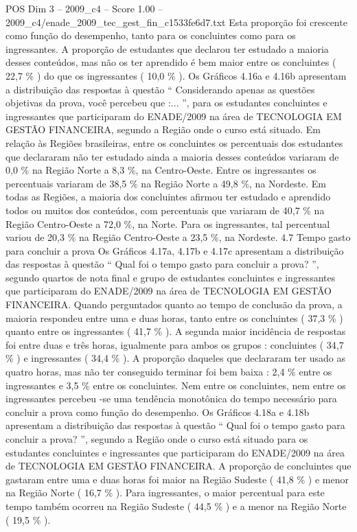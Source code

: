 \begin{textsample}{POS Dim 3 – 2009\_c4 – Score 1.00 – 2009\_c4/enade\_2009\_tec\_gest\_fin\_c1533fe6d7.txt}
Esta proporção foi crescente como função do desempenho, tanto para os concluintes como para os ingressantes.
A proporção de estudantes que declarou ter estudado a maioria desses conteúdos, mas não os ter aprendido é bem maior entre os concluintes ( 22,7 \% ) do que os ingressantes ( 10,0 \% ).
Os Gráficos 4.16a e 4.16b apresentam a distribuição das respostas à questão “ Considerando apenas as questões objetivas da prova, você percebeu que :... ”, para os estudantes concluintes e ingressantes que participaram do ENADE/2009 na área de TECNOLOGIA EM GESTÃO FINANCEIRA, segundo a Região onde o curso está situado.
Em relação às Regiões brasileiras, entre os concluintes os percentuais dos estudantes que declararam não ter estudado ainda a maioria desses conteúdos variaram de 0,0 \% na Região Norte a 8,3 \%, na Centro-Oeste.
Entre os ingressantes os percentuais variaram de 38,5 \% na Região Norte a 49,8 \%, na Nordeste.
Em todas as Regiões, a maioria dos concluintes afirmou ter estudado e aprendido todos ou muitos dos conteúdos, com percentuais que variaram de 40,7 \% na Região Centro-Oeste a 72,0 \%, na Norte.
Para os ingressantes, tal percentual variou de 20,3 \% na Região Centro-Oeste a 23,5 \%, na Nordeste. 4.7 Tempo gasto para concluir a prova Os Gráficos 4.17a, 4.17b e 4.17c apresentam a distribuição das respostas à questão “ Qual foi o tempo gasto para concluir a prova? ”, segundo quartos de nota final e grupo de estudantes concluintes e ingressantes que participaram do ENADE/2009 na área de TECNOLOGIA EM GESTÃO FINANCEIRA.
Quando perguntados quanto ao tempo de conclusão da prova, a maioria respondeu entre uma e duas horas, tanto entre os concluintes ( 37,3 \% ) quanto entre os ingressantes ( 41,7 \% ).
A segunda maior incidência de respostas foi entre duas e três horas, igualmente para ambos os grupos : concluintes ( 34,7 \% ) e ingressantes ( 34,4 \% ).
A proporção daqueles que declararam ter usado as quatro horas, mas não ter conseguido terminar foi bem baixa : 2,4 \% entre os ingressantes e 3,5 \% entre os concluintes.
Nem entre os concluintes, nem entre os ingressantes percebeu -se uma tendência monotônica do tempo necessário para concluir a prova como função do desempenho.
Os Gráficos 4.18a e 4.18b apresentam a distribuição das respostas à questão “ Qual foi o tempo gasto para concluir a prova? ”, segundo a Região onde o curso está situado para os estudantes concluintes e ingressantes que participaram do ENADE/2009 na área de TECNOLOGIA EM GESTÃO FINANCEIRA.
A proporção de concluintes que gastaram entre uma e duas horas foi maior na Região Sudeste ( 41,8 \% ) e menor na Região Norte ( 16,7 \% ).
Para ingressantes, o maior percentual para este tempo também ocorreu na Região Sudeste ( 44,5 \% ) e a menor na Região Norte ( 19,5 \% ).

\end{textsample}
